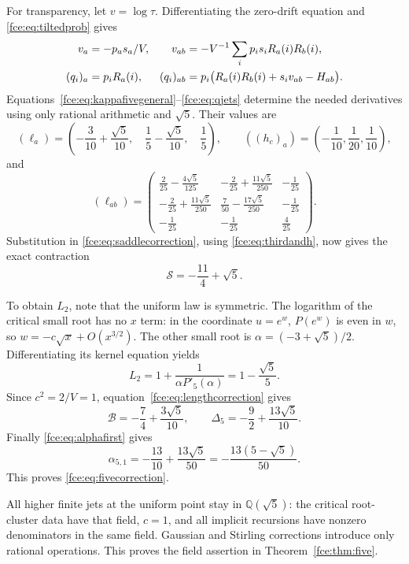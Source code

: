 \documentclass[11pt,a4paper]{article}
\numberwithin{equation}{section}
\theoremstyle{definition}\newtheorem{definition}[theorem]{Definition}
\theoremstyle{remark}\newtheorem{remark}[theorem]{Remark}
\newcommand{\Q}{\mathbb Q}
\begin{document}
For transparency, let $v=\log\tau$. Differentiating the zero-drift equation
and \eqref{fce:eq:tiltedprob} gives
\begin{align}
 v_a&=-p_as_a/V, &
 v_{ab}&=-V^{-1}\sum_i p_i s_iR_a(i)R_b(i),\notag\\
 (q_i)_a&=p_iR_a(i),&
 (q_i)_{ab}&=p_i\bigl(R_a(i)R_b(i)+s_i v_{ab}-H_{ab}\bigr).
 \label{fce:eq:qjets}
\end{align}
Equations~\eqref{fce:eq:kappafivegeneral}--\eqref{fce:eq:qjets} determine the needed
derivatives using only rational arithmetic and $\sqrt5$. Their values are
\[
 (\ell_a)=\left(-\frac3{10}+\frac{\sqrt5}{10},\quad
                   \frac15-\frac{\sqrt5}{10},\quad\frac15\right),
 \qquad ((h_c)_a)=\left(-\frac1{10},\frac1{20},\frac1{10}\right),
\]
and
\[
 (\ell_{ab})=\begin{pmatrix}
 \frac2{25}-\frac{4\sqrt5}{125}&-\frac2{25}+\frac{11\sqrt5}{250}&-\frac1{25}\\[2pt]
 -\frac2{25}+\frac{11\sqrt5}{250}&\frac7{50}-\frac{17\sqrt5}{250}&-\frac1{25}\\[2pt]
 -\frac1{25}&-\frac1{25}&\frac4{25}
 \end{pmatrix}.
\]
Substitution in \eqref{fce:eq:saddlecorrection}, using \eqref{fce:eq:thirdandh},
now gives the exact contraction
\begin{equation}\label{fce:eq:Sfive}
 \mathcal S=-\frac{11}{4}+\sqrt5.
\end{equation}

To obtain $L_2$, note that the uniform law is symmetric. The logarithm of
the critical small root has no $x$ term: in the coordinate $u=e^w$,
$P(e^w)$ is even in $w$, so $w=-c\sqrt{x}+O(x^{3/2})$. The other small
root is $\alpha=(-3+\sqrt5)/2$. Differentiating its kernel equation yields
\[
 L_2=1+\frac{1}{\alpha P'_5(\alpha)}=1-\frac{\sqrt5}{5}.
\]
Since $c^2=2/V=1$, equation~\eqref{fce:eq:lengthcorrection} gives
\[
 \mathcal B=-\frac74+\frac{3\sqrt5}{10},\qquad
 \Delta_5=-\frac92+\frac{13\sqrt5}{10}.
\]
Finally \eqref{fce:eq:alphafirst} gives
\[
 \alpha_{5,1}=-\frac{13}{10}+\frac{13\sqrt5}{50}
             =-\frac{13(5-\sqrt5)}{50}.
\]
This proves \eqref{fce:eq:fivecorrection}.

All higher finite jets at the uniform point stay in $\Q(\sqrt5)$:
the critical root-cluster data have that field, $c=1$, and all implicit
recursions have nonzero denominators in the same field. Gaussian and
Stirling corrections introduce only rational operations. This proves the
field assertion in Theorem~\ref{fce:thm:five}.
\end{document}
